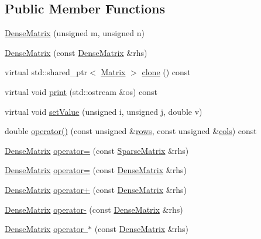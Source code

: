 \subsection*{Public Member Functions}
\begin{DoxyCompactItemize}
\item 
\mbox{\hyperlink{class_dense_matrix_acee504862635b3f43c4c7157a0b835ad}{Dense\+Matrix}} (unsigned m, unsigned n)
\item 
\mbox{\hyperlink{class_dense_matrix_a87eb921a0711e71fd0c04a8216e42fd2}{Dense\+Matrix}} (const \mbox{\hyperlink{class_dense_matrix}{Dense\+Matrix}} \&rhs)
\item 
virtual std\+::shared\+\_\+ptr$<$ \mbox{\hyperlink{class_matrix}{Matrix}} $>$ \mbox{\hyperlink{class_dense_matrix_af6334f6106e2de277daf5affabdca1da}{clone}} () const
\item 
virtual void \mbox{\hyperlink{class_dense_matrix_a0bfe50e5f3555d507a50ec52fc15dfa8}{print}} (std\+::ostream \&os) const
\item 
virtual void \mbox{\hyperlink{class_dense_matrix_a64bf2553677cd22aba4a3811d5d5b6f8}{set\+Value}} (unsigned i, unsigned j, double v)
\item 
double \mbox{\hyperlink{class_dense_matrix_a1a1d7059dbf920083526b4e17b0c1d66}{operator()}} (const unsigned \&\mbox{\hyperlink{class_matrix_ac1345e89dbffc411f5766c11fc8ebb6a}{rows}}, const unsigned \&\mbox{\hyperlink{class_matrix_af477fcaeda55b1d5b8ace1be7773c209}{cols}}) const
\item 
\mbox{\hyperlink{class_dense_matrix}{Dense\+Matrix}} \mbox{\hyperlink{class_dense_matrix_aeb227b489f8f0922dace88ad2e0a3ccf}{operator=}} (const \mbox{\hyperlink{class_sparse_matrix}{Sparse\+Matrix}} \&rhs)
\item 
\mbox{\hyperlink{class_dense_matrix}{Dense\+Matrix}} \mbox{\hyperlink{class_dense_matrix_a896beaab3cb4457f7059a69ea7abc616}{operator=}} (const \mbox{\hyperlink{class_dense_matrix}{Dense\+Matrix}} \&rhs)
\item 
\mbox{\hyperlink{class_dense_matrix}{Dense\+Matrix}} \mbox{\hyperlink{class_dense_matrix_a9af4c28ec24e57339d757ed56ea1cd97}{operator+}} (const \mbox{\hyperlink{class_dense_matrix}{Dense\+Matrix}} \&rhs)
\item 
\mbox{\hyperlink{class_dense_matrix}{Dense\+Matrix}} \mbox{\hyperlink{class_dense_matrix_a2fa05956c14587935e9f16713c9993e8}{operator-\/}} (const \mbox{\hyperlink{class_dense_matrix}{Dense\+Matrix}} \&rhs)
\item 
\mbox{\hyperlink{class_dense_matrix}{Dense\+Matrix}} \mbox{\hyperlink{class_dense_matrix_a30fc03840fabac76fe035538d3dd979b}{operator $\ast$}} (const \mbox{\hyperlink{class_dense_matrix}{Dense\+Matrix}} \&rhs)

\end{DoxyCompactItemize}
